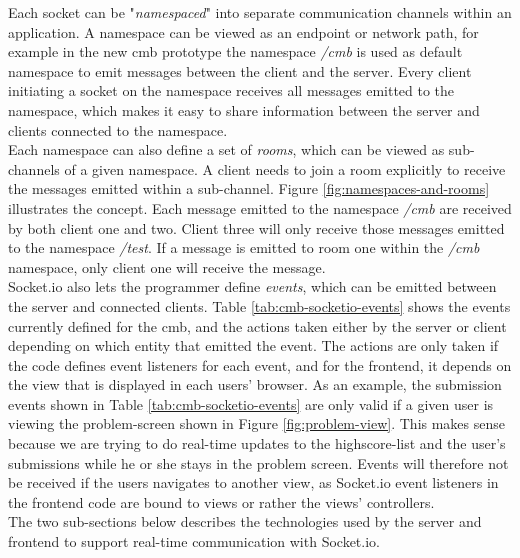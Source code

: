 Each socket can be "\textit{namespaced}" into separate communication channels within an application. A namespace can be viewed as an endpoint or network path, for example in the new \gls{cmb} prototype the namespace \textit{/cmb} is used as default namespace to emit messages between the client and the server. Every client initiating a socket on the namespace receives all messages emitted to the namespace, which makes it easy to share information between the server and clients connected to the namespace. \\

Each namespace can also define a set of \textit{rooms}, which can be viewed as sub-channels of a given namespace. A client needs to join a room explicitly to receive the messages emitted within a sub-channel. Figure \ref{fig:namespaces-and-rooms} illustrates the concept. Each message emitted to the namespace \textit{/cmb} are received by both client one and two. Client three will only receive those messages emitted to the namespace \textit{/test}. If a message is emitted to room one within the \textit{/cmb} namespace, only client one will receive the message. \\

Socket.io also lets the programmer define \textit{events}, which can be emitted between the server and connected clients. Table \ref{tab:cmb-socketio-events} shows the events currently defined for the \gls{cmb}, and the actions taken either by the server or client depending on which entity that emitted the event. The actions are only taken if the code defines event listeners for each event, and for the frontend, it depends on the view that is displayed in each users’ browser. As an example, the submission events shown in Table \ref{tab:cmb-socketio-events} are only valid if a given user is viewing the problem-screen shown in Figure \ref{fig:problem-view}. This makes sense because we are trying to do real-time updates to the highscore-list and the user’s submissions while he or she stays in the problem screen. Events will therefore not be received if the users navigates to another view, as Socket.io event listeners in the frontend code are bound to views or rather the views’ controllers.  \\

The two sub-sections below describes the technologies used by the server and frontend  to support real-time communication with Socket.io.

